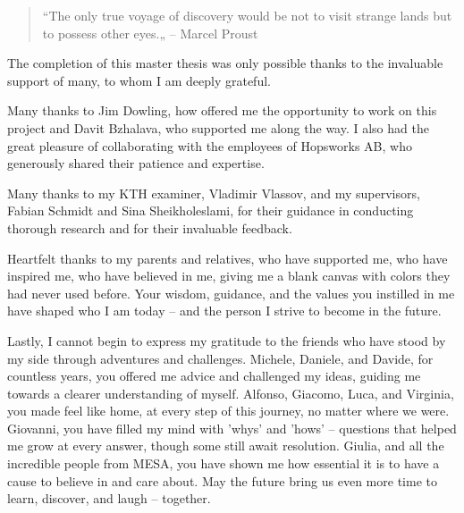 
\begin{quote}
    “The only true voyage of discovery would be not to visit strange lands but to possess other eyes.„
    -- Marcel Proust
\end{quote}
The completion of this master thesis was only possible thanks to the invaluable support of many, to whom I am deeply grateful.

Many thanks to Jim Dowling, how offered me the opportunity to work on this project and Davit Bzhalava, who supported me along the way. I also had the great pleasure of collaborating with the employees of Hopsworks AB, who generously shared their patience and expertise.

Many thanks to my KTH examiner, Vladimir Vlassov, and my supervisors, Fabian Schmidt and Sina Sheikholeslami, for their guidance in conducting thorough research and for their invaluable feedback.

Heartfelt thanks to my parents and relatives, who have supported me, who have inspired me, who have believed in me, giving me a blank canvas with colors they had never used before. Your wisdom, guidance, and the values you instilled in me have shaped who I am today -- and the person I strive to become in the future.

Lastly, I cannot begin to express my gratitude to the friends who have stood by my side through adventures and challenges. Michele, Daniele, and Davide, for countless years, you offered me advice and challenged my ideas, guiding me towards a clearer understanding of myself. Alfonso, Giacomo, Luca, and Virginia, you made feel like home, at every step of this journey, no matter where we were. Giovanni, you have filled my mind with 'whys' and 'hows' -- questions that helped me grow at every answer, though some still await resolution. Giulia, and all the incredible people from MESA, you have shown me how essential it is to have a cause to believe in and care about. May the future bring us even more time to learn, discover, and laugh -- together.